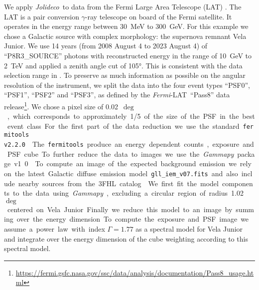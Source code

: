 \documentclass[twocolumn]{aastex631}
\newcommand{\fermi}{\textit{Fermi}-LAT~}
\newcommand{\jolideco}{\textit{Jolideco}~}
\newcommand{\gammaray}{$\gamma$-ray\xspace}
\begin{document}
     We apply \jolideco  to data from the Fermi Large Area Telescope (LAT) \citep{Atwood2009}. The LAT is a pair conversion \gammaray telescope on board of the Fermi satellite. It operates in the energy range between \qty[mode = text]{30}{MeV} to  \qty[mode = text]{300}{GeV}. For this example we chose  a Galactic source with complex morphology: the supernova remnant Vela Junior. We use 14 years (from 2008 August 4 to 2023 August 4) of \enquote{P8R3\_SOURCE} photons with reconstructed energy in the range of \qty[mode = text]{10}{GeV} to \qty[mode = text]{2}{TeV} and applied a zenith angle cut of \ang{105}. This is consistent with the data selection range in \cite{Ackermann2017}. To preserve as much information as possible on the angular resolution of the instrument, we split the data into the four event types \enquote{PSF0}, \enquote{PSF1}, \enquote{PSF2} and \enquote{PSF3}, as defined by the \fermi \enquote{Pass8} data release\footnote{\url{https://fermi.gsfc.nasa.gov/ssc/data/analysis/documentation/Pass8_usage.html}}. We chose a pixel size of \qty[mode = text]{0.02}{$\deg$}, which corresponds to approximately 1/5 of the size of the PSF in the best event class. For the first part of the data reduction we use the standard \texttt{fermitools v2.2.0} \citep{Fermitools2019}.
    
    The \texttt{fermitools} produce an energy dependent counts, exposure and PSF cube. To further reduce the data to images we use the \textit{Gammapy} package v1.0 \citep{GammapyZenodov1.0.1, Gammapy2023}. To compute an image of the expected background emission we rely on the latest Galactic diffuse emission model \texttt{gll\_iem\_v07.fits} and also include nearby sources from the 3FHL catalog \citep{Ajello2017}. We first fit the model components to the data using \textit{Gammapy}, excluding a circular region of radius \qty[mode = text]{1.02}{$\deg$} centered on Vela Junior. Finally we reduce this model to an image by summing over the energy dimension. To compute the exposure and PSF image we assume a power law with index $\Gamma=1.77$ \citep{Ajello2017} as a spectral model for Vela Junior and integrate over the energy dimension of the cube weighting according to this spectral model.
    
\end{document}
